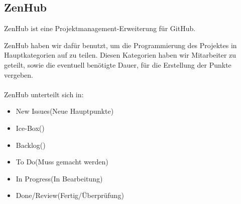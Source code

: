 \subsection{ZenHub}
ZenHub ist eine Projektmanagement-Erweiterung für GitHub.

ZenHub haben wir dafür benutzt, um die Programmierung des Projektes in Hauptkategorien auf zu teilen.
Diesen Kategorien haben wir Mitarbeiter zu geteilt, sowie die eventuell benötigte Dauer, für die Erstellung der Punkte vergeben.
\\\\
ZenHub unterteilt sich in:
\begin{itemize}
	\item New Issues(Neue Hauptpunkte)
	\item Ice-Box()
	\item Backlog()
	\item To Do(Muss gemacht werden)
	\item In Progress(In Bearbeitung)
	\item Done/Review(Fertig/Überprüfung) 
\end{itemize}
